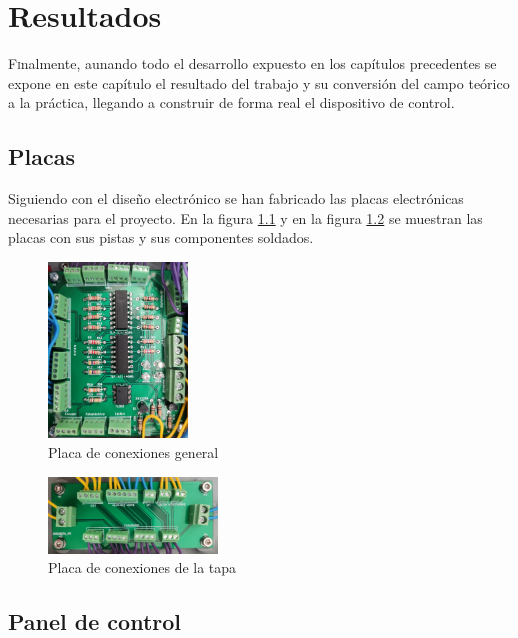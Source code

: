 \chapter{Resultados}\label{chp-07}

\lettrine[lraise=-0.1, lines=2, loversize=0.2]{F}inalmente, aunando todo el desarrollo expuesto en los capítulos precedentes se expone en este capítulo el resultado del trabajo y su conversión del campo teórico a la práctica, llegando a construir de forma real el dispositivo de control.

\section{Placas}

Siguiendo con el diseño electrónico se han fabricado las placas electrónicas necesarias para el proyecto.
En la figura \ref{fig:placafondo} y en la figura \ref{fig:placatapa} se muestran las placas con sus pistas y sus componentes soldados.

\begin{figure}[hbtp]%
    \centering 
        \includegraphics[width=0.33\textwidth]{07-resultados/placafondo.jpg}
    \caption{Placa de conexiones general}
    \label{fig:placafondo} 
\end{figure}

\begin{figure}[hbtp]%
    \centering 
        \includegraphics[width=0.4\textwidth]{07-resultados/placatapa.jpg}
    \caption{Placa de conexiones de la tapa}
    \label{fig:placatapa} 
\end{figure}

\section{Panel de control}

